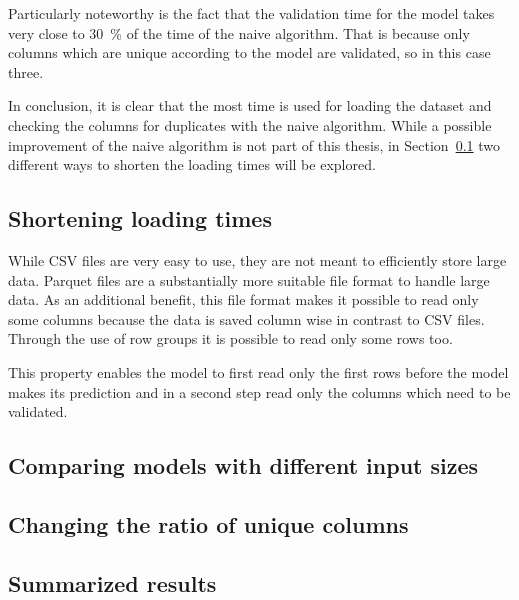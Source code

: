 Particularly noteworthy is the fact that the validation time for the model takes very close to \SI{30}{\percent} of the time of the naive algorithm. That is because only columns which are unique according to the model are validated, so in this case three.

In conclusion, it is clear that the most time is used for loading the dataset and checking the columns for duplicates with the naive algorithm. While a possible improvement of the naive algorithm is not part of this thesis, in Section~\ref{subsec:efficiency-shorter_loading_times} two different ways to shorten the loading times will be explored.


\subsection{Shortening loading times}\label{subsec:efficiency-shorter_loading_times}
While CSV files are very easy to use, they are not meant to efficiently store large data. Parquet files are a substantially more suitable file format to handle large data. As an additional benefit, this file format makes it possible to read only some columns because the data is saved column wise in contrast to CSV files. %
Through the use of row groups it is possible to read only some rows too.

This property enables the model to first read only the first rows before the model makes its prediction and in a second step read only the columns which need to be validated.



\subsection{Comparing models with different input sizes}\label{subsec:efficiency-comparing_models}


\subsection{Changing the ratio of unique columns}\label{subsec:efficiency-changing_uniques}


\subsection{Summarized results}\label{subsec:efficiency-summarized_results}
